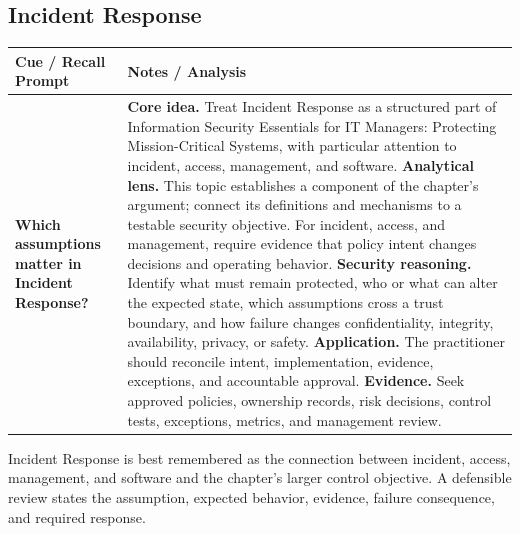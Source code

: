\documentclass[11pt]{article}
\newcommand{\CornellHeader}{%
\rowcolor{Navy}\color{white}\bfseries Cue / Recall Prompt & \color{white}\bfseries Notes / Analysis\\\hline}
\newcommand{\CornellRow}[2]{%
\cellcolor{CueGray}\RaggedRight\textbf{#1} & \RaggedRight #2\\\hline}
\begin{document}
\subsection*{Incident Response}
\begin{longtable}{>{\RaggedRight\arraybackslash}p{}|>{\RaggedRight\arraybackslash}p{}}
\CornellHeader
\CornellRow{Which assumptions matter in Incident Response?}{\textbf{Core idea.} Treat Incident Response as a structured part of Information Security Essentials for IT Managers: Protecting Mission-Critical Systems, with particular attention to incident, access, management, and software. \textbf{Analytical lens.} This topic establishes a component of the chapter's argument; connect its definitions and mechanisms to a testable security objective. For incident, access, and management, require evidence that policy intent changes decisions and operating behavior. \textbf{Security reasoning.} Identify what must remain protected, who or what can alter the expected state, which assumptions cross a trust boundary, and how failure changes confidentiality, integrity, availability, privacy, or safety. \textbf{Application.} The practitioner should reconcile intent, implementation, evidence, exceptions, and accountable approval. \textbf{Evidence.} Seek approved policies, ownership records, risk decisions, control tests, exceptions, metrics, and management review.}
\end{longtable}
\begin{topicsummary}
Incident Response is best remembered as the connection between incident, access, management, and software and the chapter's larger control objective. A defensible review states the assumption, expected behavior, evidence, failure consequence, and required response.
\end{topicsummary}
\end{document}
